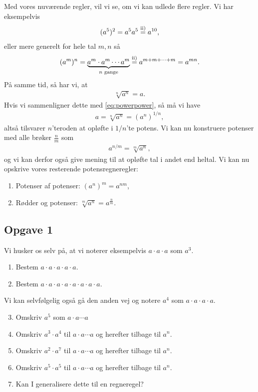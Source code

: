 Med vores nuværende regler, vil vi se, om vi kan udlede flere regler. Vi har eksempelvis
\begin{align*}
(a^5)^2 = a^5a^5 \overset{\textnormal{ii)}}{=} a^{10}, 
\end{align*}
eller mere generelt for hele tal $m,n$ så
\begin{align}\label{eq:powerpower}
(a^m)^n = \underbrace{a^m\cdot a^m\cdots a^m}_{n \textnormal{ gange}} \overset{\textnormal{ii)}}{=}  a^{m+m+\cdots+m} = a^{mn}.
\end{align}
På samme tid, så har vi, at 
\begin{align*}
\sqrt[n]{a^n} = a. 
\end{align*}
Hvis vi sammenligner dette med \eqref{eq:powerpower}, så må vi have
\begin{align*}
a = \sqrt[n]{a^n} = (a^n)^{1/n},
\end{align*}
altså tilsvarer $n$'teroden at opløfte i $1/n$'te potens. Vi kan nu konstruere potenser med alle brøker $\frac{n}{m}$ som
\begin{align*}
a^{n/m} = \sqrt[m]{a^n},
\end{align*}
og vi kan derfor også give mening til at opløfte tal i andet end heltal. 
Vi kan nu opskrive vores resterende potensregneregler:
\begin{enumerate}[label=\roman*)]
\item Potenser af potenser: $(a^n)^m = a^{nm}$,\\
\item Rødder og potenser: $\sqrt[m]{a^n} = a^{\frac{n}{m}}$.
\end{enumerate}

\subsection*{Opgave 1}
Vi husker os selv på, at vi noterer eksempelvis $a\cdot a \cdot a$ som $a^3$.
\begin{enumerate}[label=\roman*)]
	\item Bestem $a\cdot a \cdot a \cdot a \cdot a$.
	\item Bestem $a \cdot a \cdot a \cdot a \cdot a \cdot a\cdot a \cdot a$.
\end{enumerate}
Vi kan selvfølgelig også gå den anden vej og notere $a^4$ som $a\cdot a \cdot a \cdot a$.
\begin{enumerate}[label=\roman*)]
	\setcounter{enumi}{2}
	\item Omskriv $a^5$ som $a\cdot a \cdots a$
	\item Omskriv $a^3\cdot a^4$ til $a\cdot a\cdots a$ og herefter tilbage til $a^n$.
	\item Omskriv $a^2\cdot a^7$ til $a\cdot a\cdots a$ og herefter tilbage til $a^n$.
	\item Omskriv $a^5\cdot a^5$ til $a\cdot a\cdots a$ og herefter tilbage til $a^n$.
	\item Kan I generalisere dette til en regneregel?
\end{enumerate}

